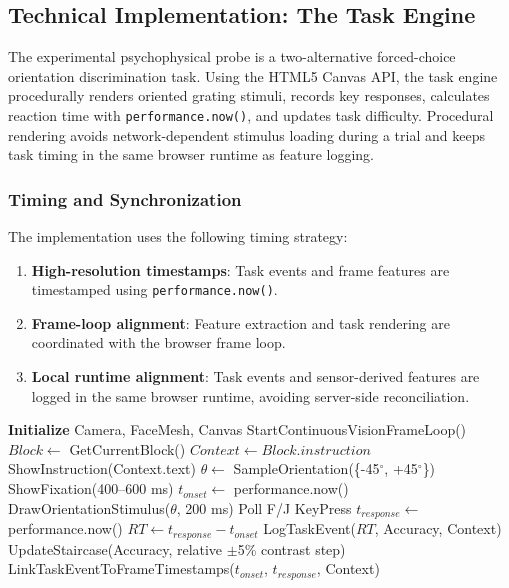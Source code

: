 \documentclass[dvipdfmx]{ehis}
\begin{document}
\subsection{Technical Implementation: The Task Engine}
The experimental psychophysical probe is a two-alternative forced-choice orientation discrimination task.
Using the HTML5 Canvas API, the task engine procedurally renders oriented grating stimuli, records key responses, calculates reaction time with \texttt{performance.now()}, and updates task difficulty.
Procedural rendering avoids network-dependent stimulus loading during a trial and keeps task timing in the same browser runtime as feature logging.

\subsubsection{Timing and Synchronization}
The implementation uses the following timing strategy:
\begin{enumerate}
    \item \textbf{High-resolution timestamps}: Task events and frame features are timestamped using \texttt{performance.now()}.
    \item \textbf{Frame-loop alignment}: Feature extraction and task rendering are coordinated with the browser frame loop.
    \item \textbf{Local runtime alignment}: Task events and sensor-derived features are logged in the same browser runtime, avoiding server-side reconciliation.
\end{enumerate}

\begin{algorithm}
\caption{Camerala Task Loop (Simplified)}
\begin{algorithmic}
\STATE \textbf{Initialize} Camera, FaceMesh, Canvas
\STATE StartContinuousVisionFrameLoop()
    \STATE $Block \leftarrow$ GetCurrentBlock()
    \STATE $Context \leftarrow Block.instruction$
    \STATE ShowInstruction(Context.text)
        \STATE $\theta \leftarrow$ SampleOrientation(\{-45$^\circ$, +45$^\circ$\})
        \STATE ShowFixation(400--600 ms)
        \STATE $t_{onset} \leftarrow$ performance.now()
        \STATE DrawOrientationStimulus($\theta$, 200 ms)
            \STATE Poll F/J KeyPress
        \ENDWHILE
        \STATE $t_{response} \leftarrow$ performance.now()
        \STATE $RT \leftarrow t_{response} - t_{onset}$
        \STATE LogTaskEvent($RT$, Accuracy, Context)
        \STATE UpdateStaircase(Accuracy, relative $\pm$5\% contrast step)
        \STATE LinkTaskEventToFrameTimestamps($t_{onset}$, $t_{response}$, Context)
    \ENDFOR
\ENDWHILE
\end{algorithmic}
\end{algorithm}
\end{document}
